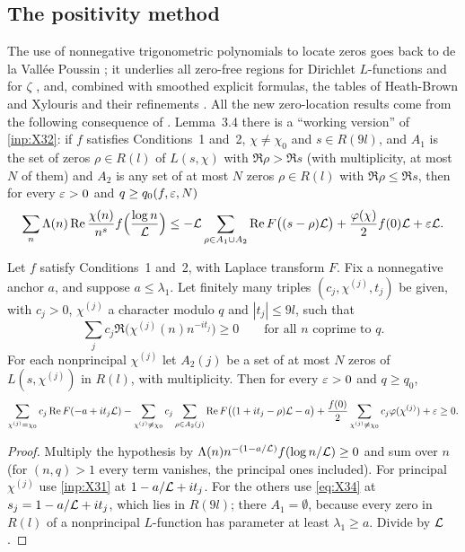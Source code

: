 \subsection{The positivity method}
The use of nonnegative trigonometric polynomials to locate zeros goes back to de la Vall\'ee
Poussin \cite{delaValleePoussin1899fonction}; it underlies all zero-free regions for Dirichlet
$L$-functions \cite{Gronwall1913series,Landau1918imaginar,Page1935number,McCurley1984explicit,
Kadiri2018explicit} and for $\zeta$ \cite{Kadiri2005region,MossinghoffTrudgian2015nonnegative}, and,
combined with smoothed explicit formulas, the tables of Heath-Brown and Xylouris and their
refinements \cite{LiuWang1998numerical}. All the new zero-location results come from the following
consequence of
\cite[Lemmas~3.1 and~3.4]{Xylouris2011nullstellen}. Lemma~3.4 there is a ``working version'' of
\cref{inp:X32}: if $f$ satisfies Conditions~1 and~2, $\chi\ne\chi_0$ and $s\in R(9l)$, and $A_1$ is the
set of zeros $\rho\in R(l)$ of $L(s,\chi)$ with $\Re\rho>\Re s$ (with multiplicity, at most $N$ of them)
and $A_2$ is any set of at most $N$ zeros $\rho\in R(l)$ with $\Re\rho\le\Re s$, then for every $\varepsilon>0$
and $q\ge q_0(f,\varepsilon,N)$
\begin{equation}\label{eq:X34}
  \sum_n\Lambda(n)\operatorname{Re}\frac{\chi(n)}{n^s}f\Bigl(\frac{\log n}{\mathcal{L}}\Bigr)\le
  -\mathcal{L}\sum_{\rho\in A_1\cup A_2}\operatorname{Re} F\bigl((s-\rho)\mathcal{L}\bigr)+\frac{\varphi(\chi)}2f(0)\mathcal{L}+\varepsilon\mathcal{L} .
\end{equation}

\begin{lemma}\label{lem:positivity}
Let $f$ satisfy Conditions~1 and~2, with Laplace transform $F$. Fix a nonnegative
anchor $a$, and suppose $a\le\lambda_1$. Let finitely many triples
$(c_j,\chi^{(j)},t_j)$ be given, with $c_j>0$, $\chi^{(j)}$ a character modulo $q$ and $|t_j|\le9l$, such
that
\[
  \sum_jc_j\Re\bigl(\chi^{(j)}(n)n^{-it_j}\bigr)\ge0\qquad\text{for all $n$ coprime to $q$.}
\]
For each nonprincipal $\chi^{(j)}$ let $A_2(j)$ be a set of at most $N$ zeros of $L(s,\chi^{(j)})$ in $R(l)$,
with multiplicity. Then for every $\varepsilon>0$ and $q\ge q_0$,
\[
  \sum_{\chi^{(j)}=\chi_0}c_j\operatorname{Re} F(-a+it_j\mathcal{L})-\sum_{\chi^{(j)}\ne\chi_0}c_j\sum_{\rho\in A_2(j)}\operatorname{Re}
  F\bigl((1+it_j-\rho)\mathcal{L}-a\bigr)+\frac{f(0)}2\sum_{\chi^{(j)}\ne\chi_0}c_j\varphi(\chi^{(j)})+\varepsilon\ge0 .
\]
\end{lemma}

\begin{proof}
Multiply the hypothesis by $\Lambda(n)n^{-(1-a/\mathcal{L})}f(\log n/\mathcal{L})\ge0$ and sum over $n$ (for $(n,q)>1$
every term vanishes, the principal ones included). For principal $\chi^{(j)}$ use \cref{inp:X31} at
$1-a/\mathcal{L}+it_j$. For the others use \eqref{eq:X34} at $s_j=1-a/\mathcal{L}+it_j$, which lies in $R(9l)$;
there $A_1=\emptyset$, because every zero in $R(l)$ of a nonprincipal $L$-function has parameter at
least $\lambda_1\ge a$. Divide by $\mathcal{L}$.
\end{proof}

